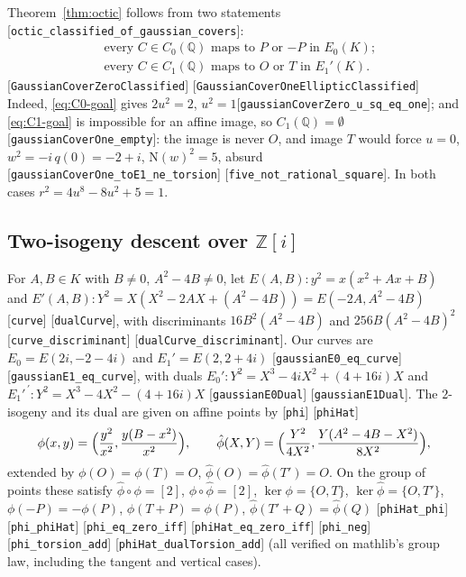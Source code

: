 \documentclass[10pt]{article}
\theoremstyle{definition}
\theoremstyle{remark}
\newcommand{\Q}{\mathbb{Q}}
\newcommand{\Z}{\mathbb{Z}}
\newcommand{\Nm}{\mathrm{N}}
\newcommand{\Oinf}{O}
\newcommand{\leanref}[1]{{\scriptsize\textup{[\texttt{#1}]}}\allowbreak}
\begin{document}
Theorem~\ref{thm:octic} follows from two statements
\leanref{octic\_\allowbreak classified\_\allowbreak of\_\allowbreak gaussian\_\allowbreak covers}:
\begin{align}
 &\text{every $C\in C_0(\Q)$ maps to $P$ or $-P$ in $E_0(K)$;}\label{eq:C0-goal}\\
 &\text{every $C\in C_1(\Q)$ maps to $\Oinf$ or $T$ in $E_1'(K)$.}\label{eq:C1-goal}
\end{align}
\leanref{Gaussian\allowbreak Cover\allowbreak Zero\allowbreak Classified} \leanref{Gaussian\allowbreak Cover\allowbreak One\allowbreak Elliptic\allowbreak Classified}
Indeed, \eqref{eq:C0-goal} gives $2u^2=2$, $u^2=1$\leanref{gaussian\allowbreak Cover\allowbreak Zero\_\allowbreak u\_\allowbreak sq\_\allowbreak eq\_\allowbreak one};
and \eqref{eq:C1-goal} is impossible for an affine image, so $C_1(\Q)=\emptyset$
\leanref{gaussian\allowbreak Cover\allowbreak One\_\allowbreak empty}: the image is never $\Oinf$, and image $T$
would force $u=0$, $w^2=-i\,q(0)=-2+i$, $\Nm(w)^2=5$, absurd
\leanref{gaussian\allowbreak Cover\allowbreak One\_\allowbreak to\allowbreak E1\_\allowbreak ne\_\allowbreak torsion} \leanref{five\_\allowbreak not\_\allowbreak rational\_\allowbreak square}.
In both cases $r^2=4u^8-8u^2+5=1$.

\subsection{Two-isogeny descent over \texorpdfstring{$\Z[i]$}{Z[i]}}\label{sec:descent}

For $A,B\in K$ with $B\ne0$, $A^2-4B\ne0$, let $E(A,B):y^2=x(x^2+Ax+B)$ and
$E'(A,B):Y^2=X(X^2-2AX+(A^2-4B))=E(-2A,A^2-4B)$
\leanref{curve} \leanref{dual\allowbreak Curve}, with discriminants $16B^2(A^2-4B)$ and
$256B(A^2-4B)^2$\leanref{curve\_\allowbreak discriminant} \leanref{dual\allowbreak Curve\_\allowbreak discriminant}.
Our curves are $E_0=E(2i,-2-4i)$ and $E_1'=E(2,2+4i)$
\leanref{gaussian\allowbreak E0\_\allowbreak eq\_\allowbreak curve} \leanref{gaussian\allowbreak E1\_\allowbreak eq\_\allowbreak curve}, with duals
$E_0':Y^2=X^3-4iX^2+(4+16i)X$ and $E_1'^{\,\prime}:Y^2=X^3-4X^2-(4+16i)X$
\leanref{gaussian\allowbreak E0\allowbreak Dual} \leanref{gaussian\allowbreak E1\allowbreak Dual}.
The $2$-isogeny and its dual are given on affine points by
\leanref{phi} \leanref{phi\allowbreak Hat}
\[
 \phi(x,y)=\Bigl(\frac{y^2}{x^2},\frac{y(B-x^2)}{x^2}\Bigr),\qquad
 \hat\phi(X,Y)=\Bigl(\frac{Y^2}{4X^2},\frac{Y(A^2-4B-X^2)}{8X^2}\Bigr),
\]
extended by $\phi(\Oinf)=\phi(T)=\Oinf$, $\hat\phi(\Oinf)=\hat\phi(T')=\Oinf$.
On the group of points these satisfy $\hat\phi\circ\phi=[2]$,
$\phi\circ\hat\phi=[2]$, $\ker\phi=\{\Oinf,T\}$, $\ker\hat\phi=\{\Oinf,T'\}$,
$\phi(-P)=-\phi(P)$, $\phi(T+P)=\phi(P)$, $\hat\phi(T'+Q)=\hat\phi(Q)$
\leanref{phi\allowbreak Hat\_\allowbreak phi} \leanref{phi\_\allowbreak phi\allowbreak Hat} \leanref{phi\_\allowbreak eq\_\allowbreak zero\_\allowbreak iff} \leanref{phi\allowbreak Hat\_\allowbreak eq\_\allowbreak zero\_\allowbreak iff} \leanref{phi\_\allowbreak neg} \leanref{phi\_\allowbreak torsion\_\allowbreak add} \leanref{phi\allowbreak Hat\_\allowbreak dual\allowbreak Torsion\_\allowbreak add}
(all verified on mathlib's group law, including the tangent and vertical cases).
\end{document}

